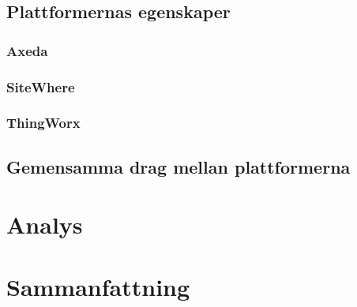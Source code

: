 \subsection{Plattformernas egenskaper}

\subsubsection{Axeda}

\subsubsection{SiteWhere}

\subsubsection{ThingWorx}

\subsection{Gemensamma drag mellan plattformerna}


\section{Analys}
\label{sec:esimluku}


\section{Sammanfattning}

